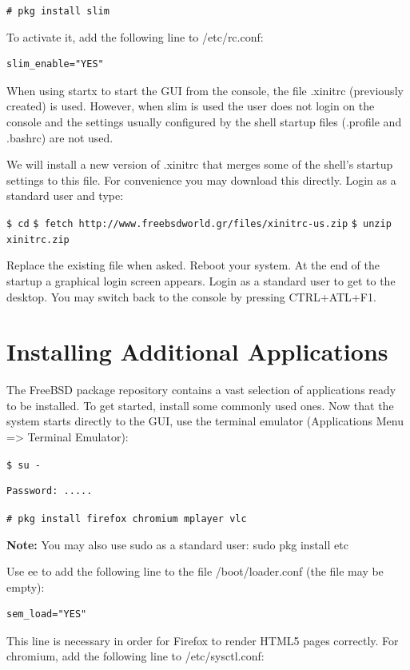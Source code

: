\documentclass[a4paper,twoside,12pt]{article}
\newcommand{\coderoot}[1]{\texttt{\# #1}}
\newcommand{\codeuser}[1]{\texttt{\$ #1}}
\begin{document}
\coderoot{pkg install slim}

To activate it, add the following line to /etc/rc.conf:

\begin{verbatim}
slim_enable="YES"
\end{verbatim}

When using startx to start the GUI from the console, the file .xinitrc (previously created) is used. However, when slim is used the user does not login on the console and the settings usually configured by the shell startup files (.profile and .bashrc) are not used.

We will install a new version of .xinitrc that merges some of the shell's startup settings to this file. For convenience you may download this directly. Login as a standard user and type:

\codeuser{cd}
\codeuser{fetch http://www.freebsdworld.gr/files/xinitrc-us.zip}
\codeuser{unzip xinitrc.zip}

Replace the existing file when asked.
Reboot your system. At the end of the startup a graphical login screen appears. Login as a standard user to get to the desktop. You may switch back to the console by pressing CTRL+ATL+F1.

\section{Installing Additional Applications}
The FreeBSD package repository contains a vast selection of applications ready to be installed. To get started, install some commonly used ones. Now that the system starts directly to the GUI, use the terminal emulator (Applications Menu => Terminal Emulator):

\codeuser{su -}
\begin{verbatim}
Password: .....
\end{verbatim}
\coderoot{pkg install firefox chromium mplayer vlc}

\textbf{Note:} You may also use sudo as a standard user: sudo pkg install etc

Use ee to add the following line to the file /boot/loader.conf (the file may be empty):

\begin{verbatim}
sem_load="YES"
\end{verbatim}

This line is necessary in order for Firefox to render HTML5 pages correctly. For chromium, add the following line to /etc/sysctl.conf:
\end{document}
